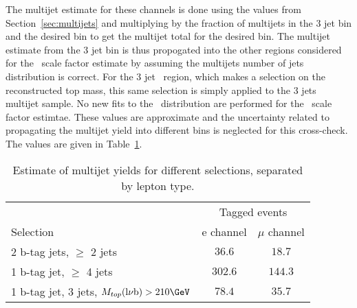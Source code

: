 
The multijet estimate for these channels is done using the values from Section~\ref{sec:multijets} and multiplying by the fraction of multijets in the 3 jet bin and the desired bin to get the multijet total for the desired bin.  The multijet estimate from the 3 jet bin is thus propogated into the other regions considered for the \ttbar~scale factor estimate by assuming the multijets number of jets distribution is correct.  For the 3 jet \ttbar~region, which makes a selection on the reconstructed top mass, this same selection is simply applied to the 3 jets multijet sample.  No new fits to the \met~distribution are performed for the \ttbar~scale factor estimtae.  These values are approximate and the uncertainty related to propagating the multijet yield into different bins is neglected for this cross-check.  The values are given in Table~\ref{tab:QCDttbar}.
\begin{table}[!h]
  \begin{center}
    \begin{tabular}{lcc}
      \hline
      \hline
      & \multicolumn{2}{c}{Tagged events} \\
      Selection & e channel & $\mu$ channel \\
      \hline
      2 b-tag jets, $\ge$ 2 jets & $ 36.6 $ & $ 18.7 $ \\
      1 b-tag jet, $\ge$ 4 jets &  $ 302.6 $ & $ 144.3 $ \\
      1 b-tag jet, 3  jets, $M_{top}(\rm l\nu b)>210\GeV$& $ 78.4 $ & $ 35.7 $ \\
      \hline
      \hline
    \end{tabular}
    \caption{\label{tab:QCDttbar} Estimate of multijet yields for different selections, separated by lepton type.}
  \end{center}
\end{table}

